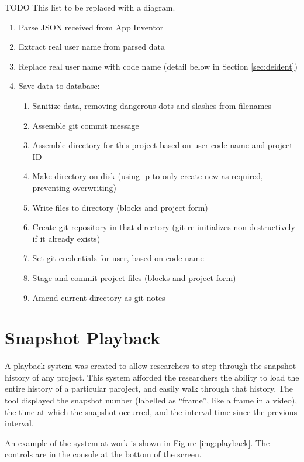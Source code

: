 TODO This list to be replaced with a diagram.
\begin{enumerate}
\item Parse JSON received from App Inventor
\item Extract real user name from parsed data
\item Replace real user name with code name (detail below in Section \ref{sec:deident})
\item Save data to database:
\begin{enumerate}
	\item Sanitize data, removing dangerous dots and slashes from filenames
	\item Assemble git commit message
	\item Assemble directory for this project based on user code name and project ID
	\item Make directory on disk (using -p to only create new as required, preventing overwriting)
	\item Write files to directory (blocks and project form)
	\item Create git repository in that directory (git re-initializes non-destructively if it already exists)
	\item Set git credentials for user, based on code name
	\item Stage and commit project files (blocks and project form)
	\item Amend current directory as git notes
\end{enumerate}
\end{enumerate}


\section{Snapshot Playback}
\label{sec:playback}

A playback system was created to allow researchers to step through the snapshot history of any project. This system afforded the researchers the ability to load the entire history of a particular paroject, and easily walk through that history. The tool displayed the snapshot number (labelled as ``frame'', like a frame in a video), the time at which the snapshot occurred, and the interval time since the previous interval. 

An example of the system at work is shown in Figure \ref{img:playback}. The controls are in the console at the bottom of the screen.

